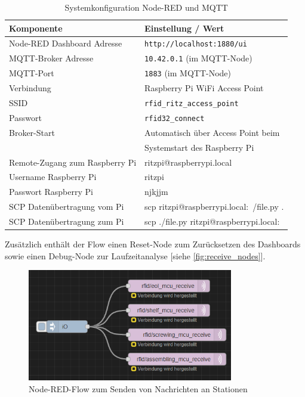 \begin{table}[H]
	\centering
	\caption{Systemkonfiguration Node-RED und MQTT}
	\label{tab:systemkonfiguration}
	\begin{tabular}{ll}
		\toprule
		\textbf{Komponente} & \textbf{Einstellung / Wert} \\
		\midrule
		Node-RED Dashboard Adresse     & \texttt{http://localhost:1880/ui} \\
		MQTT-Broker Adresse            & \texttt{10.42.0.1} (im MQTT-Node)\\
		MQTT-Port                      & \texttt{1883} (im MQTT-Node)\\
		Verbindung                     & Raspberry Pi WiFi Access Point \\
		SSID                           & \texttt{rfid\_ritz\_access\_point} \\
		Passwort                       & \texttt{rfid32\_connect} \\
		Broker-Start                   & Automatisch über Access Point beim \\  & Systemstart des Raspberry Pi\\
		Remote-Zugang zum Raspberry Pi & ritzpi@raspberrypi.local \\
		Username Raspberry Pi 	   	   & ritzpi		\\
		Passwort Raspberry Pi 		   & njkjjm	   \\
		SCP Datenübertragung vom Pi	   & scp ritzpi@raspberrypi.local:~/file.py . \\
		SCP Datenübertragung zum Pi	   & scp ./file.py ritzpi@raspberrypi.local:~ \\
		\bottomrule
	\end{tabular}
\end{table}

Zusätzlich enthält der Flow einen Reset-Node zum Zurücksetzen des Dashboards sowie einen Debug-Node zur Laufzeitanalyse [siehe \autoref{fig:receive_nodes}].

\begin{figure}[H]
	\centering
	\includegraphics[width=0.8\textwidth]{images/node-red-flow-send.png}
	\caption{Node-RED-Flow zum Senden von Nachrichten an Stationen}
	\label{fig:send_nodes}
\end{figure}

